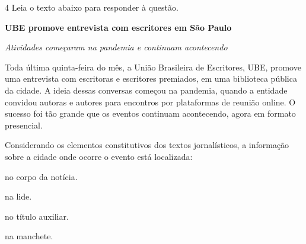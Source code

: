 \num{4} Leia o texto abaixo para responder à questão. 

\begin{myquote}

\textbf{UBE promove entrevista com escritores em São Paulo}

\textit{Atividades começaram na pandemia e continuam acontecendo}

Toda última quinta-feira do mês, a União Brasileira de Escritores, UBE,
promove uma entrevista com escritoras e escritores premiados, em uma
biblioteca pública da cidade. A ideia dessas conversas começou na pandemia,
quando a entidade convidou autoras e autores para encontros por plataformas de
reunião online. O sucesso foi tão grande que os eventos continuam acontecendo,
agora em formato presencial.




\end{myquote}

Considerando os elementos constitutivos dos textos jornalísticos, a
informação sobre a cidade onde ocorre o evento está localizada:

\begin{multicols}{2}
\begin{escolha}
  
  \item no corpo da notícia.
  
  \item na lide.
  
  \item no título auxiliar.
  
  \item na manchete.

\end{escolha}
\end{multicols}


